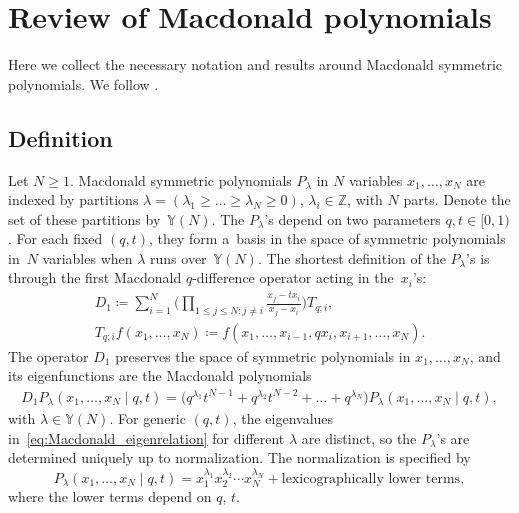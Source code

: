 \documentclass[11pt]{article}
\numberwithin{equation}{section}
\numberwithin{equation}{section}
\begin{document}
\setcounter{section}{1}
\section{Review of Macdonald polynomials}\label{sec:macdonald_polynomials}

Here we collect the necessary notation and results
around Macdonald symmetric polynomials.
We follow \cite[Chapter VI]{Macdonald1995}.

\subsection{Definition}\label{sub:Macdonald_polynomials_definition}

Let $N\ge1$.
Macdonald symmetric polynomials $P_\lambda$ in $N$ variables $x_1,\dots,x_N$
are indexed by partitions
$\lambda=(\lambda_1\ge \dots\ge \lambda_N \ge0)$, $\lambda_i\in \mathbb{Z}$,
with $N$ parts. Denote the set of these partitions by~$\mathbb{Y}(N)$.
The $P_\lambda$'s
depend on two parameters $q,t\in[0,1)$. For each fixed
$(q,t)$, they form a~basis in the space of symmetric
polynomials in~$N$ variables when $\lambda$ runs over~$\mathbb{Y}(N)$.
The shortest definition of the
$P_\lambda$'s is through the first Macdonald $q$-difference operator
acting in the~$x_i$'s:
\begin{gather*}
	D_1\coloneqq \sum_{i=1}^{N}
	\biggl( \prod_{1\le j\le N\colon j\ne i}\frac{x_j-tx_i}{x_j-x_i} \biggr)
	T_{q;i},\\ T_{q;i}f(x_1,\dots,x_N )\coloneqq f(x_1,\dots,x_{i-1},qx_i,x_{i+1},\dots,x_N ).
\end{gather*}
The operator $D_1$ preserves the space of symmetric
polynomials in $x_1,\dots,x_N $, and its eigenfunctions
are the Macdonald polynomials
\begin{gather}
	D_1P_\lambda(x_1,\dots,x_N\mid q,t )=
	\bigl( q^{\lambda_1}t^{N-1}+q^{\lambda_2}t^{N-2}+\dots+q^{\lambda_N}
	\bigr)
	P_\lambda(x_1,\dots,x_N\mid q,t ),\label{eq:Macdonald_eigenrelation}
\end{gather}
with $\lambda\in \mathbb{Y}(N)$.
For generic $(q,t)$, the eigenvalues in~\eqref{eq:Macdonald_eigenrelation}
for different $\lambda$ are distinct, so
the $P_\lambda$'s are determined uniquely up to normalization.
The normalization is specified by
\begin{equation*}
	P_\lambda(x_1,\dots,x_N\mid q,t )=
	x_1^{\lambda_1}x_2^{\lambda_2}\cdots x_N^{\lambda_N} +
	\text{lexicographically lower terms},
\end{equation*}
where the lower terms depend on $q$, $t$.
\end{document}
